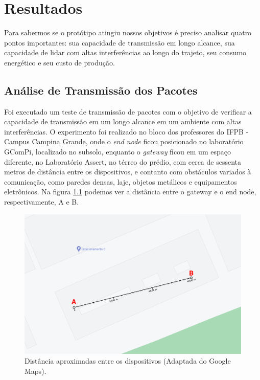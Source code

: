 \chapter{Resultados}
\label{cap:result}
Para sabermos se o protótipo atingiu nossos objetivos é preciso analisar quatro pontos importantes: sua capacidade de transmissão em longo alcance, sua capacidade de lidar com altas interferências ao longo do trajeto, seu consumo energético e seu custo de produção.

\section{Análise de Transmissão dos Pacotes}
\label{result:transmissao}
Foi executado um teste de transmissão de pacotes com o objetivo de verificar a capacidade de transmissão em um longo alcance em um ambiente com altas interferências. O experimento foi realizado no bloco dos professores do IFPB - Campus Campina Grande, onde o \textit{end node} ficou posicionado no laboratório GComPi, localizado no subsolo, enquanto o \textit{gateway} ficou em um espaço diferente, no Laboratório Assert, no térreo do prédio, com cerca de sessenta metros de distância entre os dispositivos, e contanto com obstáculos variados à comunicação, como paredes densas, laje, objetos metálicos e equipamentos eletrônicos. Na figura \ref{fig:experiment-01} podemos ver a distância entre o gateway e o end node, respectivamente, A e B.

\begin{figure}[H]
  \centering
  \includegraphics[width=.80\textwidth]{assets/experiment-01.png} 
  \caption{Distância aproximadas entre os dispositivos (Adaptada do Google Maps).}
  \label{fig:experiment-01} 
\end{figure}


